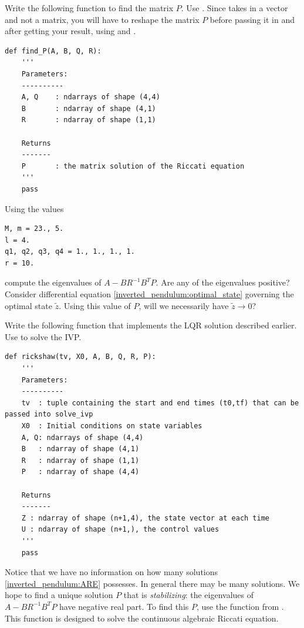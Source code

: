 \begin{problem}
Write the following function to find the matrix $P$. 
Use . 
Since  takes in a vector and not a matrix, you will have to reshape the matrix $P$ before passing it in and after getting your result, using  and .
\begin{lstlisting}
def find_P(A, B, Q, R):
	'''
	Parameters:
	----------
	A, Q 	: ndarrays of shape (4,4)
	B		: ndarray of shape (4,1)
	R		: ndarray of shape (1,1)
	
	Returns
	-------
	P		: the matrix solution of the Riccati equation
	'''
	pass

\end{lstlisting}
Using the values 
\begin{lstlisting}
M, m = 23., 5.
l = 4.
q1, q2, q3, q4 = 1., 1., 1., 1.
r = 10.
\end{lstlisting}
compute the eigenvalues of $A - BR^{-1}B^TP$.
Are any of the eigenvalues positive? 
Consider differential equation \eqref{inverted_pendulum:optimal_state} governing the optimal state $\tilde{z}$. 
Using this value of $P$, will we necessarily have $\tilde{z} \to 0$?
\end{problem}

\begin{problem}
	Write the following function that implements the LQR solution described earlier.  
	Use  to solve the IVP.
\begin{lstlisting}
def rickshaw(tv, X0, A, B, Q, R, P):
	'''
	Parameters:
	----------
	tv 	: tuple containing the start and end times (t0,tf) that can be passed into solve_ivp
	X0 	: Initial conditions on state variables
	A, Q: ndarrays of shape (4,4)
	B	: ndarray of shape (4,1)
	R	: ndarray of shape (1,1)
	P	: ndarray of shape (4,4)
	
	Returns
	-------
	Z : ndarray of shape (n+1,4), the state vector at each time
	U : ndarray of shape (n+1,), the control values
	'''
	pass
\end{lstlisting}
\label{prob:inverted_pendulum3}
\end{problem}


Notice that we have no information on how many solutions \eqref{inverted_pendulum:ARE} possesses. 
In general there may be many solutions. 
We hope to find a unique solution $P$ that is \textit{stabilizing}: the eigenvalues of $A - BR^{-1}B^TP$ have negative real part. 
To find this $P$, use the function  from . 
This function is designed to solve the continuous algebraic Riccati equation. 


